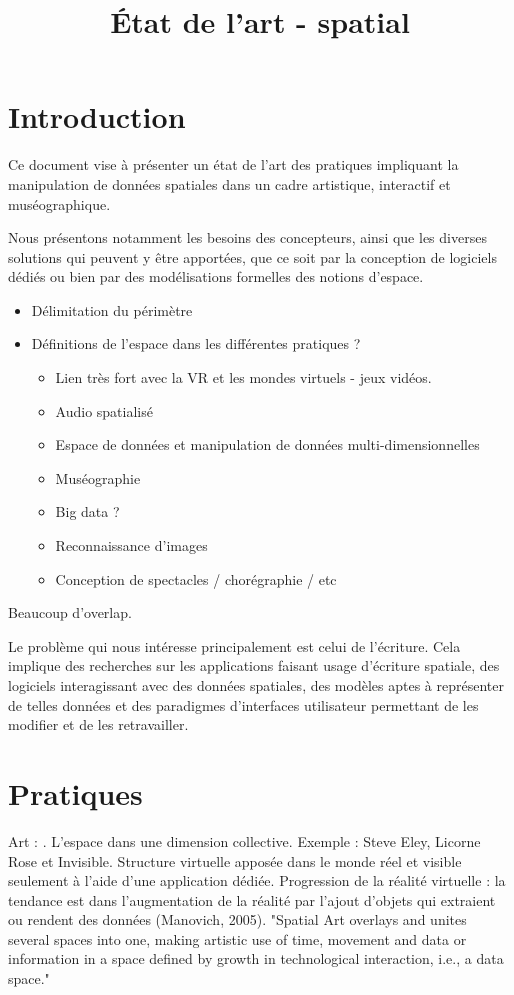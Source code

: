 \documentclass[french,12pt]{article}
\title{État de l'art - spatial}
\begin{document}
\maketitle
\tableofcontents

\section{Introduction}
Ce document vise à présenter un état de l'art des pratiques impliquant la manipulation de 
données spatiales dans un cadre artistique, interactif et muséographique.

Nous présentons notamment les besoins des concepteurs, ainsi que les diverses solutions qui 
peuvent y être apportées, que ce soit par la conception de logiciels dédiés ou bien 
par des modélisations formelles des notions d'espace.
 
\begin{itemize}
    
\item Délimitation du périmètre
 
\item Définitions de l'espace dans les différentes pratiques ?
 
 \begin{itemize}
  \item Lien très fort avec la VR et les mondes virtuels - jeux vidéos.
  \item Audio spatialisé
  \item Espace de données et manipulation de données multi-dimensionnelles
  \item Muséographie
  \item Big data ?
  \item Reconnaissance d'images 
  \item Conception de spectacles / chorégraphie / etc
\end{itemize}

\end{itemize}

Beaucoup d'overlap.
  
Le problème qui nous intéresse principalement est celui de l'écriture. Cela implique des recherches sur les applications faisant usage d'écriture spatiale, des logiciels interagissant avec des données spatiales, des modèles aptes à représenter de telles données et des paradigmes d'interfaces utilisateur permettant de les modifier et de les retravailler. 



\section{Pratiques}
Art : \cite{lodi_spatial_2014}. L'espace dans une dimension collective. Exemple : Steve Eley, Licorne Rose et Invisible. Structure virtuelle apposée dans le monde réel et visible seulement à l'aide d'une application dédiée. Progression de la réalité virtuelle : la tendance est dans l'augmentation de la réalité par l'ajout d'objets qui extraient ou rendent des données (Manovich, 2005). "Spatial Art overlays and unites several spaces into one, making artistic use of time, movement and data or information in a space defined by growth in technological interaction, i.e., a data space."
\end{document}
